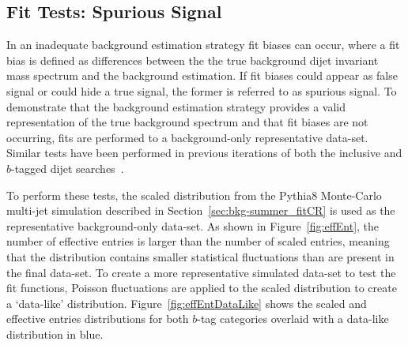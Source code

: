 \FloatBarrier
\subsection{Fit Tests: Spurious Signal}
\label{sec:bkg-summer_spusig}

In an inadequate background estimation strategy fit biases can occur,
where a fit bias is defined as differences between the the true background
dijet invariant mass spectrum and the background estimation.
If fit biases could appear as false signal or could hide a true signal, the former is referred to as spurious signal.
To demonstrate that the background estimation strategy provides a valid representation of the true background spectrum
and that fit biases are not occurring, fits are performed to a background-only representative data-set.
Similar tests have been performed in previous iterations of both the inclusive and $b$-tagged dijet searches~\cite{dijet-mori16_paper,dibjet-mori16_paper}.

To perform these tests, the scaled distribution from the {\sc Pythia}8 Monte-Carlo multi-jet simulation
described in Section~\ref{sec:bkg-summer_fitCR}
is used as the representative background-only data-set.
As shown in Figure~\ref{fig:effEnt},
the number of effective entries is larger than the number of scaled entries,
meaning that the distribution contains smaller statistical fluctuations than are present in the final data-set.
To create a more representative simulated data-set to test the fit functions,
Poisson fluctuations are applied to the scaled distribution to create a `data-like' distribution.
Figure~\ref{fig:effEntDataLike} shows the scaled and effective entries distributions for both
$b$-tag categories overlaid with a data-like distribution in blue.


